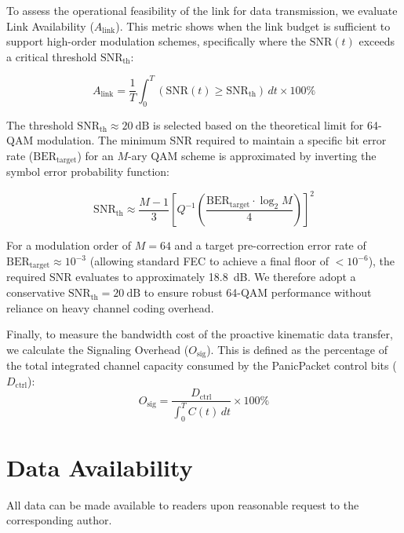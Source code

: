 \documentclass[fleqn,10pt]{wlscirep}
\begin{document}
To assess the operational feasibility of the link for data transmission, we evaluate Link Availability ($A_{\text{link}}$). This metric shows when the link budget is sufficient to support high-order modulation schemes, specifically where the $\text{SNR}(t)$ exceeds a critical threshold $\text{SNR}_{\text{th}}$:

\begin{equation}
    A_{\text{link}} = \frac{1}{T} \int_{0}^{T} \mathbb{}(\text{SNR}(t) \geq \text{SNR}_{\text{th}}) \, dt \times 100\%
\end{equation}

The threshold $\text{SNR}_{\text{th}} \approx \SI{20}{\deci\bel}$ is selected based on the theoretical limit for 64-QAM modulation. The minimum SNR required to maintain a specific bit error rate ($\text{BER}_{\text{target}}$) for an $M$-ary QAM scheme is approximated by inverting the symbol error probability function:

\begin{equation}
    \text{SNR}_{\text{th}} \approx \frac{M-1}{3} \left[ Q^{-1} \left( \frac{\text{BER}_{\text{target}} \cdot \log_2 M}{4} \right) \right]^2
\end{equation}

For a modulation order of $M=64$ and a target pre-correction error rate of $\text{BER}_{\text{target}} \approx 10^{-3}$ (allowing standard FEC to achieve a final floor of $<10^{-6}$), the required SNR evaluates to approximately \SI{18.8}{\deci\bel}. We therefore adopt a conservative $\text{SNR}_{\text{th}} = \SI{20}{\deci\bel}$ to ensure robust 64-QAM performance without reliance on heavy channel coding overhead.

Finally, to measure the bandwidth cost of the proactive kinematic data transfer, we calculate the Signaling Overhead ($O_{\text{sig}}$). This is defined as the percentage of the total integrated channel capacity consumed by the PanicPacket control bits ($D_{\text{ctrl}}$):
\begin{equation}
    O_{\text{sig}} = \frac{D_{\text{ctrl}}}{\int_{0}^{T} C(t) \, dt} \times 100\%
\end{equation}


\section*{Data Availability}
All data can be made available to readers upon reasonable request to the corresponding author. 
\end{document}
